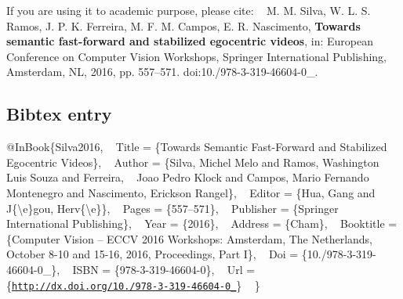 If you are using it to academic purpose, please cite\+: ~\newline
 M. M. Silva, W. L. S. Ramos, J. P. K. Ferreira, M. F. M. Campos, E. R. Nascimento, {\bfseries Towards semantic fast-\/forward and stabilized egocentric videos}, in\+: European Conference on Computer Vision Workshops, Springer International Publishing, Amsterdam, NL, 2016, pp. 557–571. doi\+:10./978-\/3-\/319-\/46604-\/0\+\_.\hypertarget{index_bibtex_subsec}{}\subsection{Bibtex entry}\label{index_bibtex_subsec}
{\ttfamily  @In\+Book\{Silva2016, ~\newline
 Title = \{Towards Semantic Fast-\/\+Forward and Stabilized Egocentric Videos\}, ~\newline
 Author = \{Silva, Michel Melo and Ramos, Washington Luis Souza and Ferreira, ~\newline
 Joao Pedro Klock and Campos, Mario Fernando Montenegro and Nascimento, Erickson Rangel\}, ~\newline
 Editor = \{Hua, Gang and J\{\textbackslash{}\textquotesingle{}e\}gou, Herv\{\textbackslash{}\textquotesingle{}e\}\}, ~\newline
 Pages = \{557--571\}, ~\newline
 Publisher = \{Springer International Publishing\}, ~\newline
 Year = \{2016\}, ~\newline
 Address = \{Cham\}, ~\newline
 Booktitle = \{Computer Vision -- E\+C\+CV 2016 Workshops\+: Amsterdam, The Netherlands, ~\newline
 October 8-\/10 and 15-\/16, 2016, Proceedings, Part I\}, ~\newline
 Doi = \{10./978-\/3-\/319-\/46604-\/0\+\_\}, ~\newline
 I\+S\+BN = \{978-\/3-\/319-\/46604-\/0\}, ~\newline
 Url = \{\href{http://dx.doi.org/10.1007/978-3-319-46604-0_40}{\tt http\+://dx.\+doi.\+org/10./978-\/3-\/319-\/46604-\/0\+\_}\} ~\newline
\} } 